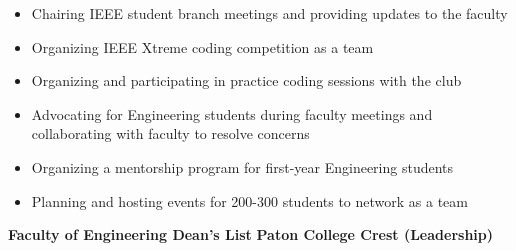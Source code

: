 \begin{itemize}
    \item Chairing IEEE student branch meetings and providing updates to the faculty
    \item Organizing IEEE Xtreme coding competition as a team
\end{itemize}

\divider

\begin{itemize}
    \item Organizing and participating in practice coding sessions with the club
\end{itemize}

\divider

\begin{itemize}
    \item Advocating for Engineering students during faculty meetings and collaborating with faculty to resolve concerns
    \item Organizing a mentorship program for first-year Engineering students
    \item Planning and hosting events for 200-300 students to network as a team
\end{itemize}



\divider\smallskip




\vspace{-8}
\hspace{2pt}\color{Green} {\Large\faTrophy} \color{black} \hspace{7pt} \textbf{Faculty of Engineering Dean’s List}\vspace{8pt} \newline
\hspace{2pt}\color{Green} {\Large\faTrophy} \color{black} \hspace{7pt} \textbf{Paton College Crest \small(Leadership)}\vspace{8pt}
\medskip
\medskip
\medskip
\medskip
\medskip
\medskip
\medskip

